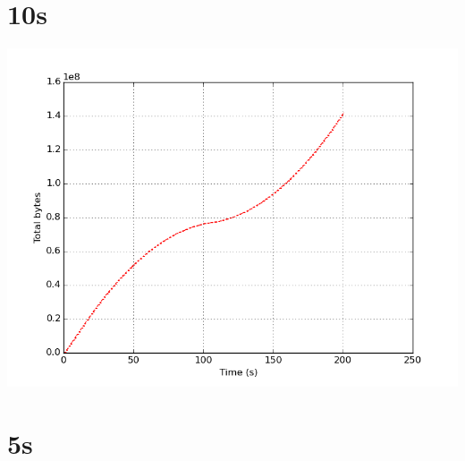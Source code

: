 \documentclass{article}
\begin{document}
\belowcaptionskip=-10pt


\section{10s}
    \noindent\begin{minipage}{.45\textwidth}
    
    \end{minipage}\hfill
    \begin{minipage}{.45\textwidth}
    
    \end{minipage}
    
    \begin{center}
    \includegraphics{set_a_10s/set_a_10s.png}
    \end{center}
\clearpage

\section{5s}
    \noindent\begin{minipage}{.45\textwidth}
    
    \end{minipage}\hfill
    \begin{minipage}{.45\textwidth}
    
    \end{minipage}
    
\end{document}
